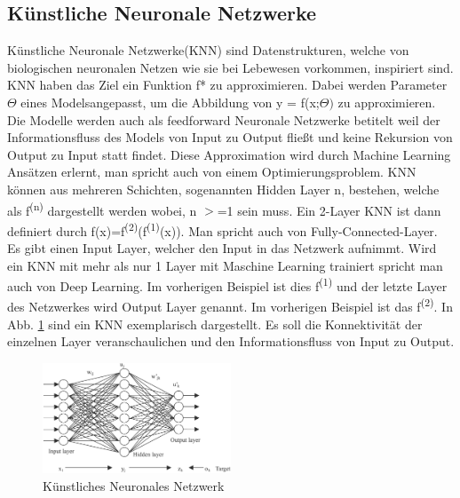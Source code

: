 \documentclass{llncs}
\begin{document}
\subsection{Künstliche Neuronale Netzwerke}

Künstliche Neuronale Netzwerke(KNN) sind Datenstrukturen, welche von biologischen neuronalen Netzen wie sie bei Lebewesen vorkommen, inspiriert sind. KNN haben das Ziel ein Funktion f* zu approximieren. Dabei werden Parameter $\Theta$ eines Modelsangepasst, um die Abbildung von y = f(x;$\Theta)$ zu approximieren. Die Modelle werden auch als feedforward Neuronale Netzwerke betitelt weil der Informationsfluss des Models von Input zu Output fließt und keine Rekursion von Output zu Input statt findet. Diese Approximation wird durch Machine Learning Ansätzen erlernt, man spricht auch von einem Optimierungsproblem. KNN können aus mehreren Schichten, sogenannten Hidden Layer n, bestehen, welche als f\textsuperscript{(n)} dargestellt werden wobei, n $>$=1 sein muss. Ein 2-Layer KNN ist dann definiert durch f(x)=f\textsuperscript{(2)}(f\textsuperscript{(1)}(x)). Man spricht auch von Fully-Connected-Layer. Es gibt einen Input Layer, welcher den Input in das Netzwerk aufnimmt\cite{Grundlagen}. Wird ein KNN mit mehr als nur 1 Layer mit Maschine Learning trainiert spricht man auch von Deep Learning. Im vorherigen Beispiel ist dies f\textsuperscript{(1)} und der letzte Layer des Netzwerkes wird Output Layer genannt. Im vorherigen Beispiel ist das f\textsuperscript{(2)}. In Abb. \ref{fig:Bild1} sind ein KNN exemplarisch dargestellt. Es soll die Konnektivität der einzelnen Layer veranschaulichen und den Informationsfluss von Input zu Output. 

\begin{figure}[htbp]
	\centering
	\includegraphics[width=0.5\textwidth]{neuronalesnetzwerk.png}
	\caption{Künstliches Neuronales Netzwerk\protect\cite{annpic}}
	\label{fig:Bild1}
\end{figure}
\end{document}

